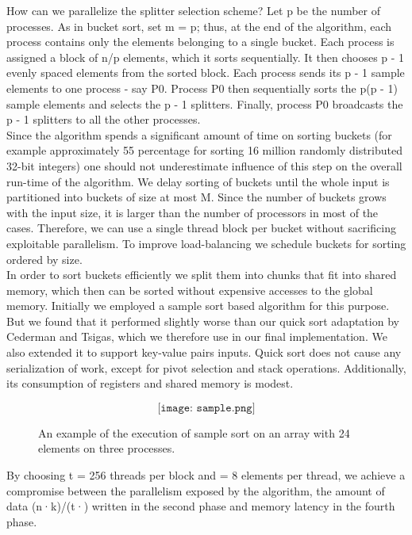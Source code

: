 \documentclass[conference]{IEEEtran}
\begin{document}
How can we parallelize the splitter selection scheme? Let p be the number of processes. As in bucket sort, set m = p; thus, at the end of the algorithm, each process contains only the elements belonging to a single bucket. Each process is assigned a block of n/p elements, which it sorts sequentially. It then chooses p - 1 evenly spaced elements from the sorted block. Each process sends its p - 1 sample elements to one process - say P0. Process P0 then sequentially sorts the p(p - 1) sample elements and selects the p - 1 splitters. Finally, process P0 broadcasts the p - 1 splitters to all the other processes.\\

Since the algorithm spends a significant
amount of time on sorting buckets (for example approximately
55 percentage for sorting 16 million randomly distributed
32-bit integers) one should not underestimate influence of
this step on the overall run-time of the algorithm. We delay
sorting of buckets until the whole input is partitioned into
buckets of size at most M. Since the number of buckets
grows with the input size, it is larger than the number of
processors in most of the cases. Therefore, we can use a
single thread block per bucket without sacrificing exploitable
parallelism. To improve load-balancing we schedule buckets
for sorting ordered by size.\\

In order to sort buckets efficiently we split them into
chunks that fit into shared memory, which then can be
sorted without expensive accesses to the global memory.
Initially we employed a sample sort based algorithm for
this purpose. But we found that it performed slightly worse
than our quick sort adaptation by Cederman and Tsigas,
which we therefore use in our final implementation. We
also extended it to support key-value pairs inputs. Quick sort
does not cause any serialization of work, except for pivot
selection and stack operations. Additionally, its consumption
of registers and shared memory is modest. \\


\begin{figure}[h]
\[\texttt{[image: sample.png]}\]
\caption{An example of the execution of sample sort on an array with 24 elements on three processes.}
\end{figure}
 By choosing t = 256 threads per block and = 8
elements per thread, we achieve a compromise between the
parallelism exposed by the algorithm, the amount of data
(n·k)/(t·) written in the second phase and memory latency
in the fourth phase.\\
\end{document}
